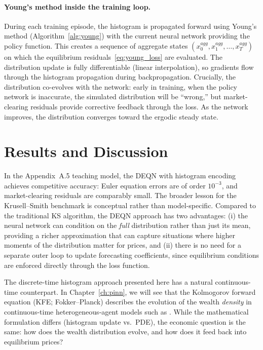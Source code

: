 \documentclass[11pt,a4paper]{report}
\begin{document}
\paragraph{Young's method inside the training loop.}
During each training episode, the histogram is propagated forward using Young's method (Algorithm~\ref{alg:young}) with the current neural network providing the policy function.  This creates a sequence of aggregate states $(x_0^{agg}, x_1^{agg}, \ldots, x_T^{agg})$ on which the equilibrium residuals~\eqref{eq:young_loss} are evaluated.  The distribution update is fully differentiable (linear interpolation), so gradients flow through the histogram propagation during backpropagation.  Crucially, the distribution co-evolves with the network: early in training, when the policy network is inaccurate, the simulated distribution will be ``wrong,'' but market-clearing residuals provide corrective feedback through the loss.  As the network improves, the distribution converges toward the ergodic steady state.

\section{Results and Discussion}
\label{sec:young_results}

In the Appendix~A.5 teaching model, the DEQN with histogram encoding achieves competitive accuracy: Euler equation errors are of order $10^{-3}$, and market-clearing residuals are comparably small.  The broader lesson for the Krusell--Smith benchmark is conceptual rather than model-specific.  Compared to the traditional KS algorithm, the DEQN approach has two advantages: (i) the neural network can condition on the \emph{full} distribution rather than just its mean, providing a richer approximation that can capture situations where higher moments of the distribution matter for prices, and (ii) there is no need for a separate outer loop to update forecasting coefficients, since equilibrium conditions are enforced directly through the loss function.

\begin{remarkbox}
The discrete-time histogram approach presented here has a natural continuous-time counterpart.  In Chapter~\ref{ch:pinn}, we will see that the Kolmogorov forward equation (KFE; Fokker--Planck) describes the evolution of the wealth \emph{density} in continuous-time heterogeneous-agent models such as \citet{achdou2022income}.  While the mathematical formulation differs (histogram update vs.\ PDE), the economic question is the same: how does the wealth distribution evolve, and how does it feed back into equilibrium prices?
\end{remarkbox}
\end{document}
